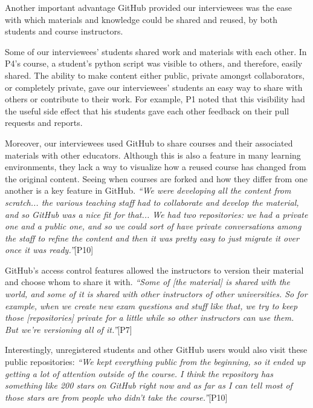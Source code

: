 Another important advantage GitHub provided our interviewees was the ease with which materials and knowledge could be shared and reused, by both students and course instructors.

Some of our interviewees' students shared work and materials with each other. In P4's course, a student's python script was visible to others, and therefore, easily shared. The ability to make content either public, private amongst collaborators, or completely private, gave our interviewees' students an easy way to share with others or contribute to their work. For example, P1 noted that this visibility had the useful side effect that his students gave each other feedback on their pull requests and reports.

Moreover, our interviewees used GitHub to share courses and their associated materials with other educators. Although this is also a feature in many learning environments, they lack a way to visualize how a reused course has changed from the original content. Seeing when courses are forked and how they differ from one another is a key feature in GitHub.
\textit{``We were developing all the content from scratch... the various teaching staff had to collaborate and develop the material, and so GitHub was a nice fit for that... We had two repositories: we had a private one and a public one, and so we could sort of have private conversations among the staff to refine the content and then it was pretty easy to just migrate it over once it was ready.''}[P10]

GitHub's access control features allowed the instructors to version their material and choose whom to share it with. \textit{``Some of [the material] is shared with the world, and some of it is shared with other instructors of other universities. So for example, when we create new exam questions and stuff like that, we try to keep those [repositories] private for a little while so other instructors can use them. But we're versioning all of it.''}[P7]

Interestingly, unregistered students and other GitHub users would also visit these public repositories: \textit{``We kept everything public from the beginning, so it ended up getting a lot of attention outside of the course. I think the repository has something like 200 stars on GitHub right now and as far as I can tell most of those stars are from people who didn't take the course.''}[P10]

